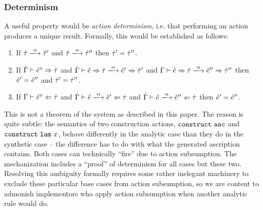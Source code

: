 \subsubsection{Determinism}
A useful property would be \emph{action determinism}, i.e. that performing an action produces a unique result. Formally, this would be established as follows:
\begin{enumerate}[itemsep=0px,partopsep=0px,topsep=0px]
\item If $\performTyp{\ztau}{\alpha}{\ztau'}$ and $\performTyp{\ztau}{\alpha}{\ztau''}$ then $\hat{\tau}'=\hat{\tau}''$.
\item If $\dot{\Gamma} \vdash \hat{e}^{\diamond} \Rightarrow \dot{\tau}$ and
  $\performSyn{\hGamma}{\zexp}{\htau}{\alpha}{\zexp'}{\htau'}$ and
  $\performSyn{\hGamma}{\zexp}{\htau}{\alpha}{\zexp''}{\htau''}$ then
  $\hat{e}' = \hat{e}''$ and $\dot{\tau}' = \dot{\tau}''$.

\item If $\dot{\Gamma} \vdash \hat{e}^{\diamond} \Leftarrow \dot{\tau}$ and
  $\performAna{\hGamma}{\zexp}{\htau}{\alpha}{\zexp'}$ and
  $\performAna{\hGamma}{\zexp}{\htau}{\alpha}{\zexp''}$ then $\hat{e}' =
  \hat{e}''$.
\end{enumerate}

This is not a theorem of the system as described in this paper. The reason is quite subtle: the semantics of two construction actions, $\mathtt{construct}~\mathtt{asc}$ and $\mathtt{construct}~\mathtt{lam}~x$, behave differently in the analytic case than they do in the synthetic case -- the difference has to do with what the generated ascription contains. Both cases can technically ``fire'' due to action subsumption. The mechanization includes a ``proof'' of determinism for all cases but these two. Resolving this ambiguity formally requires some rather inelegant machinery to exclude these particular base cases from action subsumption, so we are content to admonish implementors who apply action subsumption when another analytic rule would do. 